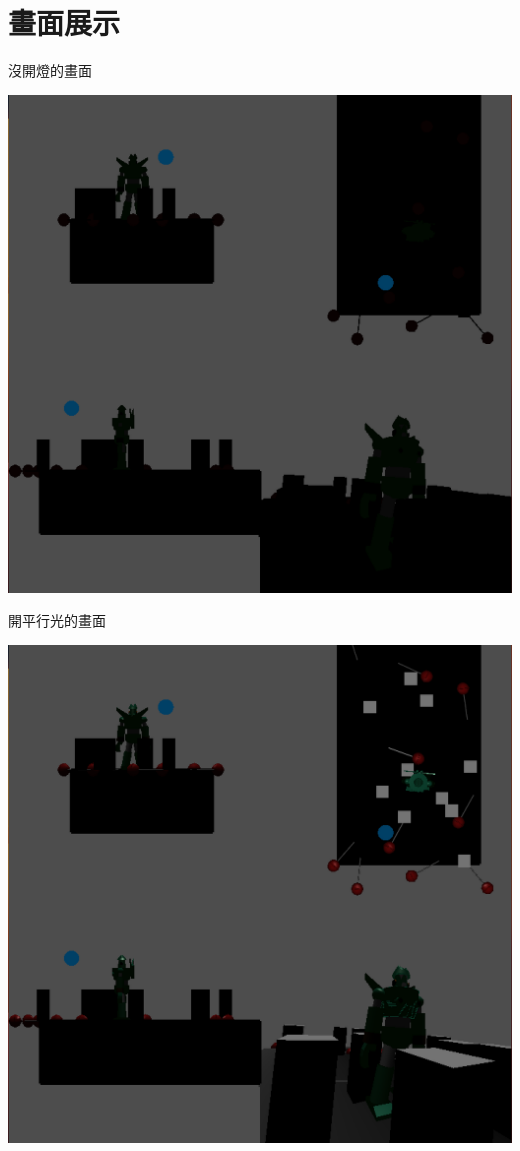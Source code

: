 \documentclass[a4,12pt]{article}
\begin{document}
    \section{畫面展示}
    \begin{multicols}{2}

        沒開燈的畫面

        \includegraphics[scale=0.28]{pic.png}

        \columnbreak

        開平行光的畫面

        \includegraphics[scale=0.28]{pic1.png}

    \end{multicols}
\end{document}
